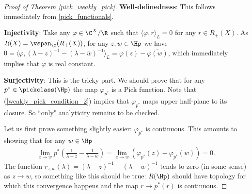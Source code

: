 \begin{proof}[Proof of Theorem \ref{pick_weakly_pick}]
	\textbf{Well-definedness}: This follows immediately from \ref{pick_functionals}.

	\textbf{Injectivity}: Take any $\varphi \in \C^{X}/\R$ such that $\langle \varphi, r \rangle_{L} = 0$ for any $r \in R_{+}(X)$. As $R(X) = \vspan_{\C}(R_{+}(X))$, for any $z, w \in \Hp$ we have $0 = \langle \varphi, (\lambda - z)^{-1} - (\lambda - \overline{w})^{-1}\rangle_{L} = \varphi(z) - \overline{\varphi(w)}$, which immediately implies that $\varphi$ is real constant.

	\textbf{Surjectivity}: This is the tricky part. We should prove that for any $p^{*} \in \pickclass(\Hp)$ the map $\varphi_{p^{*}}$ is a Pick function. Note that (\ref{weakly_pick_condition_2}) implies that $\varphi_{p^{*}}$ maps upper half-plane to its closure. So ``only" analyticity remains to be checked.

	Let us first prove something slightly easier: $\varphi_{p^{*}}$ is continuous. This amounts to showing that for any $w \in \Hp$
	\begin{align*}
		\lim_{z \to w} p^{*}\left(\frac{1}{\lambda - z} - \frac{1}{\lambda - w} \right) = \lim_{z \to w}\left(\varphi_{p^{*}}(z) - \varphi_{p^{*}}(w)\right) = 0.
	\end{align*}
	The function $r_{z, w}(\lambda) = (\lambda - z)^{-1} - (\lambda - w)^{-1}$ tends to zero (in some sense) as $z \to w$, so something like this should be true: $R(\Hp)$ should have topology for which this convergence happens and the map $r \to p^{*} (r)$ is continuous.


\end{proof}

